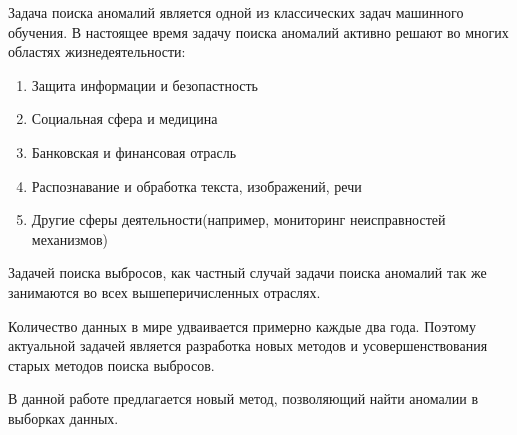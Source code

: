 \Introduction

Задача поиска аномалий является одной из классических задач машинного обучения. В настоящее время задачу поиска аномалий активно решают во многих областях жизнедеятельности:
\begin{enumerate} 
	\item Защита информации и безопастность
	\item Социальная сфера и медицина
	\item Банковская и финансовая отрасль
	\item Распознавание и обработка текста, изображений, речи
	\item Другие сферы деятельности(например, мониторинг неисправностей механизмов)
\end{enumerate}
Задачей поиска выбросов, как частный случай задачи поиска аномалий так же занимаются во всех вышеперичисленных отраслях. 

Количество данных в мире удваивается примерно каждые два года. Поэтому актуальной задачей является разработка новых методов и усовершенствования старых методов поиска выбросов.

В данной работе предлагается новый метод, позволяющий найти аномалии в выборках данных.




